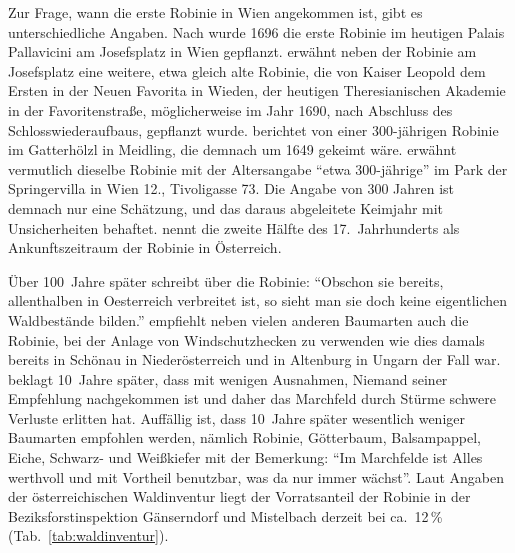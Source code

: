 \documentclass[twocolumn]{scrartcl}
\begin{document}
Zur Frage, wann die erste Robinie in Wien angekommen ist, gibt es
unterschiedliche Angaben. Nach \citet[S.~147]{loudon1838arboretum1}
wurde 1696 die erste Robinie im heutigen Palais Pallavicini am
Josefsplatz in Wien
gepflanzt. \citet[S.~15--16]{jacquin1825univGarten} erwähnt neben der
Robinie am Josefsplatz eine weitere, etwa gleich alte Robinie, die von
Kaiser Leopold dem Ersten in der Neuen Favorita in Wieden, der
heutigen Theresianischen Akademie in der Favoritenstraße,
möglicherweise im Jahr 1690, nach Abschluss des Schlosswiederaufbaus,
gepflanzt wurde. \citet{jagr1949robinie} berichtet von einer
300-jährigen Robinie im Gatterhölzl in Meidling, die demnach um 1649
gekeimt wäre. \citet{anonymNatLand1949robinie} erwähnt vermutlich
dieselbe Robinie mit der Altersangabe \enquote{etwa 300-jährige} im
Park der Springervilla in Wien 12., Tivoligasse 73. Die Angabe von 300
Jahren ist demnach nur eine Schätzung, und das daraus abgeleitete
Keimjahr mit Unsicherheiten behaftet. \citet[S.~1395]{hegi1924band43}
nennt die zweite Hälfte des 17.~Jahrhunderts als Ankunftszeitraum der
Robinie in Österreich.

Über 100~Jahre später schreibt
\citet[S.~339]{Feistmantel1835dieForstwissenschaft} über die Robinie:
\hypertarget{german:Feistmantel1835dieForstwissenschaft}{\enquote{Obschon sie bereits, allenthalben in Oesterreich verbreitet
  ist, so sieht man sie doch keine eigentlichen Waldbestände bilden.}}
\citet{hofmann1851baumloseEbenen} empfiehlt neben vielen anderen
Baumarten auch die Robinie, bei der Anlage von Windschutzhecken zu
verwenden wie dies damals bereits in Schönau in Niederösterreich und
in Altenburg in Ungarn der Fall war.
\citet{hofmann1861waldbaumCulturWarchfelde} beklagt 10~Jahre später,
dass mit wenigen Ausnahmen, Niemand seiner Empfehlung nachgekommen ist
und daher das Marchfeld durch Stürme schwere Verluste erlitten hat.
Auffällig ist, dass 10~Jahre später wesentlich weniger Baumarten
empfohlen werden, nämlich Robinie, Götterbaum, Balsampappel, Eiche,
Schwarz- und Weißkiefer mit der Bemerkung: \hypertarget{german:hofmann1861waldbaumCulturWarchfelde}{\enquote{Im Marchfelde ist
  Alles werthvoll und mit Vortheil benutzbar, was da nur immer
  wächst}}.
Laut Angaben der österreichischen Waldinventur
\citep{bfw2025waldinventurWeb} liegt der Vorratsanteil der Robinie in
der Beziksforstinspektion Gänserndorf und Mistelbach derzeit bei
ca.\ 12\,\% (Tab.~\ref{tab:waldinventur}).
\end{document}
